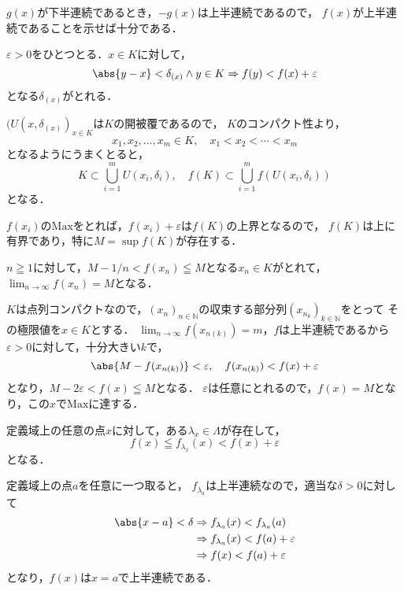 
\begin{tproof}
    $g(x)$が下半連続であるとき，$-g(x)$は上半連続であるので，
    $f(x)$が上半連続であることを示せば十分である．

    $\varepsilon >0$をひとつとる．$ x\in K$に対して，
    \[
        \abs{y-x} < \delta_{(x)} \land y \in K \Rightarrow f(y) < f(x) + \varepsilon
    \]
    となる$\delta_{(x)}$がとれる．

    $(U(x,\delta_{(x)})_{x\in K}$は$K$の開被覆であるので，
    $K$のコンパクト性より，
    \[
        x_1 , x_2, \ldots , x_m \in K , \quad x_1 < x_2 < \cdots < x_m
    \]
    となるようにうまくとると，
    \[
        K \subset \bigcup_{i=1}^m U(x_i,\delta_i) ,\quad f(K) \subset \bigcup_{i=1}^m f(U(x_i,\delta_i))
    \]
    となる．

    $f(x_i)$の$\mathrm{Max}$をとれば，$f(x_i)+\varepsilon$は$f(K)$の上界となるので，
    $f(K)$は上に有界であり，特に$M = \sup f(K)$が存在する．

    $n \geqq 1$に対して，$ M - 1/n < f(x_n) \leqq M$となる$x_n \in K$がとれて，
    $\lim_{n \to \infty} f(x_n) = M$となる．

    $K$は点列コンパクトなので，$(x_n)_{n \in \mathbb{N}}$の収束する部分列$(x_{n_k})_{k \in \mathbb{N}}$をとって
    その極限値を$ x\in K$とする．
    $\lim_{n \to \infty} f(x_{n(k)})=m$，$f$は上半連続であるから
    $\varepsilon >0$に対して，十分大きい$k$で，
    \[
        \abs{M-f(x_{n(k)})} < \varepsilon,\quad f(x_{n(k)})<f(x)+\varepsilon
    \]
    となり，$M-2 \varepsilon < f(x) \leqq M $となる．
    $\varepsilon$は任意にとれるので，$f(x) = M$となり，この$x$で$\mathrm{Max}$に達する．
\end{tproof}



\begin{tproof}
    定義域上の任意の点$x$に対して，ある$ \lambda_x \in \Lambda$が存在して，
    \[
        f(x) \leqq f_{\lambda_x} (x) < f(x) + \varepsilon
    \]
    となる．

    定義域上の点$a$を任意に一つ取ると，
    $f_{\lambda_a}$は上半連続なので，適当な$\delta >0$に対して
    \begin{align*}
        \abs{x-a}<\delta & \Rightarrow f_{\lambda_a}(x) < f_{\lambda_a}(a)     \\
                         & \Rightarrow  f_{\lambda_a}(x) < f (a) + \varepsilon \\
                         & \Rightarrow f(x) < f(a) + \varepsilon
    \end{align*}
    となり，$f(x)$は$x=a$で上半連続である．
\end{tproof}


